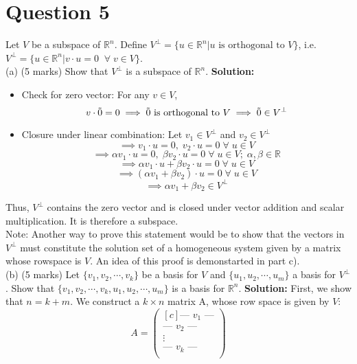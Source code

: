 \documentclass{article}
\begin{document}
\newpage

\section*{Question 5}
\newline
Let $V$ be a subspace of $\mathbb{R}^n$. Define $V^\perp = \{u \in \mathbb{R}^n | u \text{ is orthogonal to } V \}$, i.e. $V^\perp = \{u \in \mathbb{R}^n | v \cdot u = 0 \; \; \forall \; v \in V \}$.
\newline
\\ (a) (5 marks) Show that $V^\perp$ is a subspace of $\mathbb{R}^n$.
\newline
\textbf{Solution:}
\begin{itemize}
    \item Check for zero vector: For any $v \in V$, 
    $$v \cdot \Tilde{0} = 0 \implies \Tilde{0} \text{ is orthogonal to } V \implies \Tilde{0} \in V^\perp $$
    \item Closure under linear combination:
    Let $v_1 \in V^\perp$ and $v_2 \in V^\perp$
    $$\implies v_1 \cdot u = 0, \; v_2 \cdot u = 0 \; \forall \; u \in V$$
    $$\implies \alpha v_1 \cdot u = 0, \; \beta v_2 \cdot u = 0 \; \forall \; u \in V; \; \alpha, \beta \in \mathbb{R}$$
    $$\implies \alpha v_1 \cdot u + \beta v_2 \cdot u = 0 \; \forall \; u \in V$$
    $$ \implies (\alpha v_1 + \beta v_2) \cdot u = 0 \; \forall \; u \in V$$
    $$ \implies \alpha v_1 + \beta v_2 \in V^\perp$$
\end{itemize}
Thus, $V^\perp$ contains the zero vector and is closed under vector addition and scalar multiplication. It is therefore a subspace.
\\ Note: Another way to prove this statement would be to show that the vectors in $V^\perp$ must constitute the solution set of a homogeneous system given by a matrix whose rowspace is $V$. An idea of this proof is demonstarted in part c).
\newline
\\ (b) (5 marks) Let $\{v_1, v_2, \cdots , v_k\}$ be a basis for $V$ and $\{u_1, u_2, \cdots , u_m\}$ a basis for $V^\perp$. Show that $\{v_1, v_2, \cdots , v_k, u_1, u_2, \cdots , u_m\}$ is a basis for $\mathbb{R}^n$.
\newline
\textbf{Solution:}
First, we show that $n = k + m$. We construct a $k \times n$ matrix A, whose row space is given by $V$:
$$A = 
\begin{pmatrix}[c]
    \text{--- } v_1  \text{ ---} \\
    \text{--- } v_2  \text{ ---} \\
    \vdots \\
    \text{--- } v_k  \text{ ---} \\
\end{pmatrix}
$$
\end{document}
